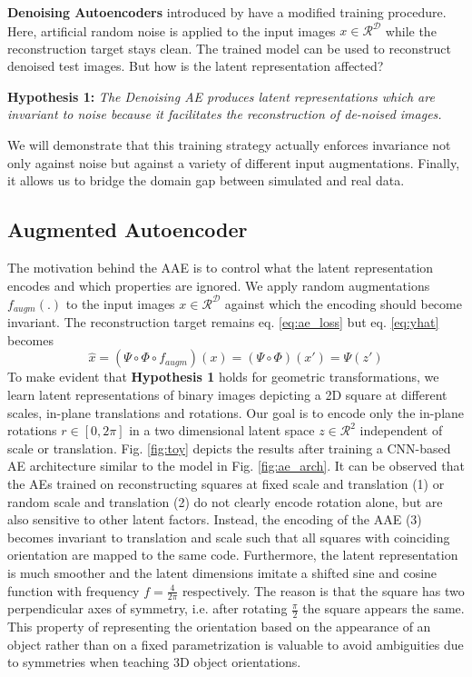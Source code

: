 \textbf{Denoising Autoencoders} introduced by \cite{vincent2010stacked} have a modified training procedure. Here, artificial random noise is applied to the input images $x \in \mathcal{R}^{\mathcal{D}}$ while the reconstruction target stays clean. The trained model can be used to reconstruct denoised test images. But how is the latent representation affected? 

\textbf{Hypothesis 1:} \textit{The Denoising AE produces latent representations which are invariant to noise because it facilitates the reconstruction of de-noised images.}

We will demonstrate that this training strategy actually enforces invariance not only against noise but against a variety of different input augmentations. Finally, it allows us to bridge the domain gap between simulated and real data.

\subsection{Augmented Autoencoder}
\label{sec:aae}

The motivation behind the \gls{AAE} is to control what the latent representation encodes and which properties are ignored. We apply random augmentations $f_{augm}(.)$ to the input images $x \in \mathcal{R}^{\mathcal{D}}$ against which the encoding should become invariant. The reconstruction target remains eq. \eqref{eq:ae_loss} but eq. \eqref{eq:yhat} becomes
\begin{equation}
\hat{x} = (\Psi\circ\Phi\circ f_{augm})(x) = (\Psi\circ\Phi)(x') = \Psi(z')
\end{equation}
To make evident that \textbf{Hypothesis 1} holds for geometric transformations, we learn latent representations of binary images depicting a 2D square at different scales, in-plane translations and rotations. Our goal is to encode only the in-plane rotations $r \in [0,2 \pi]$ in a two dimensional latent space $z \in \mathcal{R}^{2}$ independent of scale or translation. Fig. \ref{fig:toy} depicts the results after training a \gls{CNN}-based \gls{AE} architecture similar to the model in Fig. \ref{fig:ae_arch}. It can be observed that the \glspl{AE} trained on reconstructing squares at fixed scale and translation (1) or random scale and translation (2) do not clearly encode rotation alone, but are also sensitive to other latent factors. Instead, the encoding of the \gls{AAE} (3) becomes invariant to translation and scale such that all squares with coinciding orientation are mapped to the same code. Furthermore, the latent representation is much smoother and the latent dimensions imitate a shifted sine and cosine function with frequency $f=\frac{4}{2 \pi}$ respectively. The reason is that the square has two perpendicular axes of symmetry, i.e. after rotating $\frac{\pi}{2}$ the square appears the same. This property of representing the orientation based on the appearance of an object rather than on a fixed parametrization is valuable to avoid ambiguities due to symmetries when teaching 3D object orientations.


